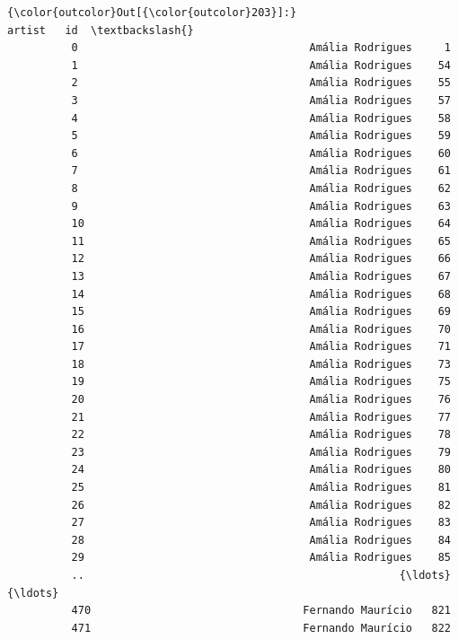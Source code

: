 \documentclass[11pt]{article}
\begin{document}
\begin{Verbatim}[commandchars=\\\{\}]
{\color{outcolor}Out[{\color{outcolor}203}]:}                                                 artist   id  \textbackslash{}
          0                                    Amália Rodrigues     1   
          1                                    Amália Rodrigues    54   
          2                                    Amália Rodrigues    55   
          3                                    Amália Rodrigues    57   
          4                                    Amália Rodrigues    58   
          5                                    Amália Rodrigues    59   
          6                                    Amália Rodrigues    60   
          7                                    Amália Rodrigues    61   
          8                                    Amália Rodrigues    62   
          9                                    Amália Rodrigues    63   
          10                                   Amália Rodrigues    64   
          11                                   Amália Rodrigues    65   
          12                                   Amália Rodrigues    66   
          13                                   Amália Rodrigues    67   
          14                                   Amália Rodrigues    68   
          15                                   Amália Rodrigues    69   
          16                                   Amália Rodrigues    70   
          17                                   Amália Rodrigues    71   
          18                                   Amália Rodrigues    73   
          19                                   Amália Rodrigues    75   
          20                                   Amália Rodrigues    76   
          21                                   Amália Rodrigues    77   
          22                                   Amália Rodrigues    78   
          23                                   Amália Rodrigues    79   
          24                                   Amália Rodrigues    80   
          25                                   Amália Rodrigues    81   
          26                                   Amália Rodrigues    82   
          27                                   Amália Rodrigues    83   
          28                                   Amália Rodrigues    84   
          29                                   Amália Rodrigues    85   
          ..                                                 {\ldots}  {\ldots}   
          470                                 Fernando Maurício   821   
          471                                 Fernando Maurício   822   

\end{Verbatim}
\end{document}
